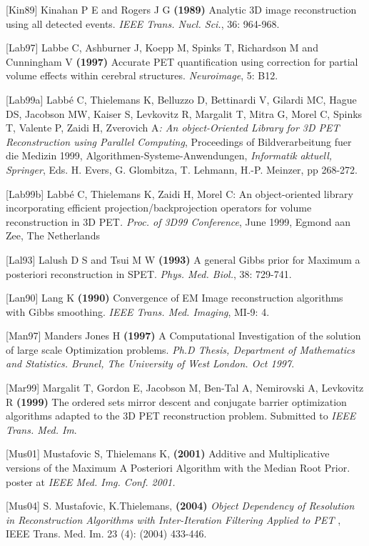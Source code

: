 \documentclass{article}
\begin{document}
{[}Kin89] Kinahan P E and Rogers J G \textbf{(1989)} Analytic 3D image 
reconstruction using all detected events. \textit{IEEE Trans. Nucl. 
Sci.}, 36: 964-968.


{[}Lab97] Labbe C, Ashburner J, Koepp M, Spinks T, Richardson M 
and Cunningham V \textbf{(1997)} Accurate PET quantification using 
correction for partial volume effects within cerebral structures. \textit{Neuroimage}, 
5: B12.


{[}Lab99a] Labb\'{e} C, Thielemans K, Belluzzo D, Bettinardi V, Gilardi 
MC, Hague DS, Jacobson MW, Kaiser S, Levkovitz R, Margalit T, 
Mitra G, Morel C, Spinks T, Valente P, Zaidi H, Zverovich A\textit{: 
An object-Oriented Library for 3D PET Reconstruction using Parallel 
Computing}, Proceedings of Bildverarbeitung fuer die Medizin 
1999, Algorithmen-Systeme-Anwendungen, \textit{Informatik} 
\textit{aktuell, Springer}, Eds. H. Evers, G. Glombitza, T. Lehmann, 
H.-P. Meinzer, pp 268-272. 


{[}Lab99b] Labb\'{e} C, Thielemans K, Zaidi H, Morel C: An object-oriented 
library incorporating efficient projection/backprojection operators 
for volume reconstruction in 3D PET\textit{. Proc. of 3D99 Conference}, 
June 1999, Egmond aan Zee, The Netherlands 


{[}Lal93] Lalush D S and Tsui M W \textbf{(1993)} A general Gibbs prior 
for Maximum a posteriori reconstruction in SPET. \textit{Phys. Med. 
Biol.}, 38: 729-741.

{[}Lan90] Lang K \textbf{(1990)} Convergence of EM Image reconstruction 
algorithms with Gibbs smoothing. \textit{IEEE Trans. Med. Imaging}, 
MI-9: 4.


{[}Man97] Manders Jones H \textbf{(1997)} A Computational Investigation 
of the solution of large scale Optimization problems. \textit{Ph.D 
Thesis, Department of Mathematics and Statistics. Brunel, The 
University of West London. Oct 1997}.


{[}Mar99] Margalit T, Gordon E, Jacobson M, Ben-Tal A, Nemirovski 
A, Levkovitz R \textbf{(1999)} The ordered sets mirror descent and 
conjugate barrier optimization algorithms adapted to the 3D PET 
reconstruction problem. Submitted to \textit{IEEE Trans. Med. Im}.

{[}Mus01] Mustafovic S, Thielemans K, \textbf{(2001)} Additive and Multiplicative 
versions of the Maximum A Posteriori Algorithm with the Median 
Root Prior. poster at \textit{IEEE Med. Img. Conf. 2001.}


{[}Mus04] S. Mustafovic, K.Thielemans, \textbf{(200}\textbf{4}\textbf{)} \textit{Object 
Dependency of Resolution in Reconstruction Algorithms with Inter-Iteration 
Filtering Applied to PET} , IEEE Trans. Med. Im. 23 (4): (2004) 
433-446.
\end{document}
